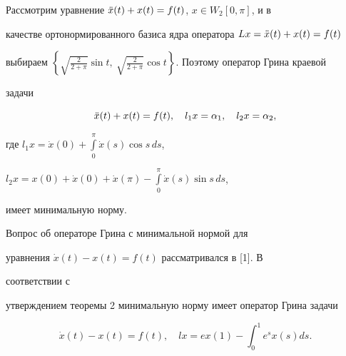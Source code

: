 \begin{exam} 


Рассмотрим уравнение $\Ddot x(t)+x(t)=f(t)$, $x\in W_2[0,\pi]$, и в 


качестве ортонормированного базиса ядра оператора $L x=\Ddot 


x(t)+x(t)=f(t)$ 


выбираем $\left\{\sqrt{\frac{2}{2+\pi}}\sin t,\ 


\sqrt{\frac{2}{2+\pi}}\cos t\right\}$. Поэтому оператор Грина краевой 


задачи 


$$ 


\Ddot x(t)+x(t)=f(t),\quad l_1x=\alpha_1,\quad 


l_2x=\alpha_2, 


$$ 


где $l_1x=\Dot x(0)+\int\limits^\pi_0\Dot x(s)\cos s\,d s$, 


$l_2x=x(0)+\Dot x(0)+\Dot x(\pi)- 


\int\limits^\pi_0 \Dot x(s)\sin s\,d s$, 


имеет минимальную норму. 


\end{exam} 


 


\begin{exam} 


Вопрос об операторе Грина с минимальной нормой для 


уравнения $\Dot x(t)-x(t)=f(t)$ рассматривался в [1]. В 


соответствии с  


утверждением теоремы 2 минимальную норму имеет оператор Грина задачи 


$$ 


\Dot x(t)-x(t)=f(t),\quad 


l x=e x(1)-\int^1_0 e^s x(s)d s. 


$$ 


\end{exam} 


 


